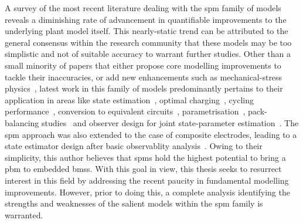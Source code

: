 A survey  of the  most recent  literature dealing with  the \gls{spm}  family of
models reveals a diminishing rate of advancement in quantifiable improvements to
the underlying plant model itself. This nearly-static trend can be attributed to
the general  consensus within the  research community  that these models  may be
too  simplistic  and  not  of  suitable accuracy  to  warrant  further  studies.
Other  than a  small  minority  of papers  that  either  propose core  modelling
improvements  to tackle  their inaccuracies,  or  add new  enhancements such  as
mechanical-stress  physics~\cite{Li2017a,Li2018b}, latest  work  in this  family
of  models predominantly  pertains  to  their application  in  areas like  state
estimation~\cite{Chaochun2018,Lin2017,Tran2017,Moura2017,Zou2016a},      optimal
charging~\cite{Perez2017,Perez2017a},    cycling    performance~\cite{Maia2017},
conversion           to            equivalent           circuits~\cite{Li2017b},
parametrisation~\cite{Li2018,Rajabloo2017,Bizeray2017,Namor2017}, pack-balancing
studies~\cite{Docimo2018a}  and   observer  design  for   joint  state-parameter
estimation~\cite{Ascencio2016}. The \gls{spm} approach  was also extended to the
case of  composite electrodes, leading to  a state estimator design  after basic
observablity  analysis~\cite{Bartlett2015}.  Owing  to  their  simplicity,  this
author believes that \glspl{spm} hold the highest potential to bring a \gls{pbm}
to embedded \glspl{bms}. With this goal  in view, this thesis seeks to resurrect
interest in this field by addressing the recent paucity in fundamental modelling
improvements. However, prior to doing  this, a complete analysis identifying the
strengths and  weaknesses of the salient  models within the \gls{spm}  family is
warranted.


